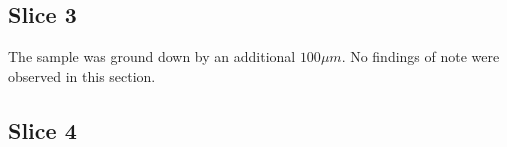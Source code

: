\documentclass{article}
\begin{document}
\FloatBarrier
\subsection{Slice 3}
The sample was ground down by an additional $100 \mu m$. No findings of note were observed in this section.

\subsection{Slice 4}
\end{document}
